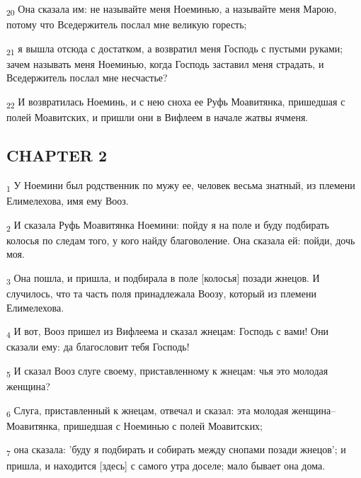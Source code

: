 \begin{tcolorbox}
\textsubscript{20} Она сказала им: не называйте меня Ноеминью, а называйте меня Марою, потому что Вседержитель послал мне великую горесть;
\end{tcolorbox}
\begin{tcolorbox}
\textsubscript{21} я вышла отсюда с достатком, а возвратил меня Господь с пустыми руками; зачем называть меня Ноеминью, когда Господь заставил меня страдать, и Вседержитель послал мне несчастье?
\end{tcolorbox}
\begin{tcolorbox}
\textsubscript{22} И возвратилась Ноеминь, и с нею сноха ее Руфь Моавитянка, пришедшая с полей Моавитских, и пришли они в Вифлеем в начале жатвы ячменя.
\end{tcolorbox}
\subsection{CHAPTER 2}
\begin{tcolorbox}
\textsubscript{1} У Ноемини был родственник по мужу ее, человек весьма знатный, из племени Елимелехова, имя ему Вооз.
\end{tcolorbox}
\begin{tcolorbox}
\textsubscript{2} И сказала Руфь Моавитянка Ноемини: пойду я на поле и буду подбирать колосья по следам того, у кого найду благоволение. Она сказала ей: пойди, дочь моя.
\end{tcolorbox}
\begin{tcolorbox}
\textsubscript{3} Она пошла, и пришла, и подбирала в поле [колосья] позади жнецов. И случилось, что та часть поля принадлежала Воозу, который из племени Елимелехова.
\end{tcolorbox}
\begin{tcolorbox}
\textsubscript{4} И вот, Вооз пришел из Вифлеема и сказал жнецам: Господь с вами! Они сказали ему: да благословит тебя Господь!
\end{tcolorbox}
\begin{tcolorbox}
\textsubscript{5} И сказал Вооз слуге своему, приставленному к жнецам: чья это молодая женщина?
\end{tcolorbox}
\begin{tcolorbox}
\textsubscript{6} Слуга, приставленный к жнецам, отвечал и сказал: эта молодая женщина--Моавитянка, пришедшая с Ноеминью с полей Моавитских;
\end{tcolorbox}
\begin{tcolorbox}
\textsubscript{7} она сказала: 'буду я подбирать и собирать между снопами позади жнецов'; и пришла, и находится [здесь] с самого утра доселе; мало бывает она дома.
\end{tcolorbox}
